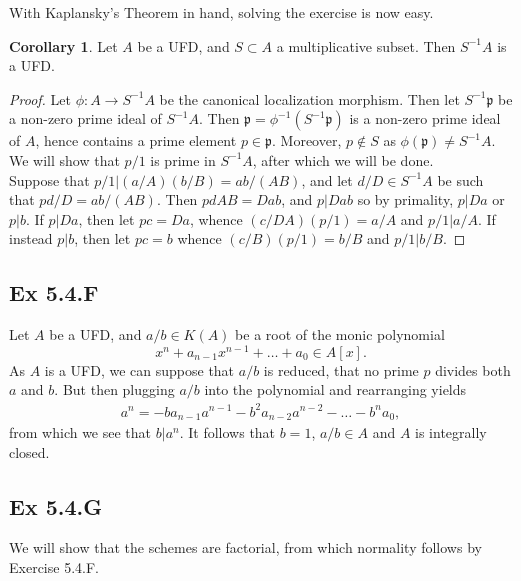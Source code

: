 \documentclass{article}
\theoremstyle{definition}
\newtheorem{corollary}[theorem]{Corollary}
\begin{document}
With Kaplansky's Theorem in hand, solving the exercise is now easy. 

\begin{corollary}
	Let $A$ be a UFD, and $S \subset A$ a multiplicative subset.
	Then $S^{-1}A$ is a UFD.
\end{corollary}
\begin{proof}
	
	Let $\phi : A \to S^{-1}A$ be the canonical localization morphism. Then let
	$S^{-1}\mathfrak{p}$ be a non-zero prime ideal of $S^{-1}A$. Then
	$\mathfrak{p} = \phi^{-1}(S^{-1}\mathfrak{p})$ is a non-zero prime ideal of
	$A$, hence contains a prime element $p \in \mathfrak{p}$. Moreover, $p \not
	\in S$ as $\phi(\mathfrak{p}) \not = S^{-1}A$. We will show that $p/1$ is
	prime in $S^{-1}A$, after which we will be done. \\

	Suppose that $p/1 | (a/A) (b/B) = ab/(AB)$, and let $d/D \in S^{-1}A$ be
	such that $pd/D = ab/(AB)$. Then $pdAB = Dab$, and $p | Dab$ so by
	primality, $p | Da$ or $p | b$. If $p | Da$, then let $pc = Da$, whence
	$(c/DA)(p/1) = a/A$ and $p/1 | a/A$. If instead $p | b$, then let $pc = b$
	whence $(c/B)(p/1) = b/B$ and $p/1 | b/B$.

\end{proof}

\subsection*{Ex 5.4.F}

Let $A$ be a UFD, and $a/b \in K(A)$ be a root of the monic polynomial 
\[
	x^n + a_{n - 1}x^{n-1} + \ldots + a_0 \in A[x].
\] 
As $A$ is a UFD, we can suppose that $a/b$ is reduced, that no prime $p$
divides both $a$ and $b$. But then plugging $a/b$ into the polynomial and
rearranging yields
\begin{align*}
	a^n
	=
	- 
	b a_{n - 1} a^{n - 1}
	- 
	b^2 a_{n - 2} a^{n - 2}
	-
	\ldots 
	-
	b^{n}a_0,
\end{align*}
from which we see that $b | a^n$. It follows that $b = 1$, $a/b \in A$ and $A$
is integrally closed.

\subsection*{Ex 5.4.G}

We will show that the schemes are factorial, from which normality follows by
Exercise 5.4.F. \\
\end{document}
